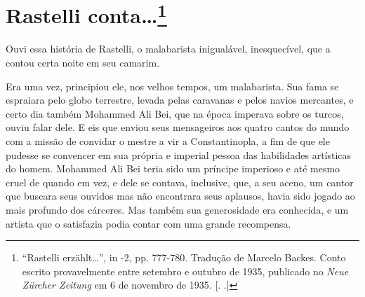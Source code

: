 \chapter{Rastelli conta\ldots{}\footnote[*]{``Rastelli erzählt\ldots{}'', in  -2, pp.
  777-780. Tradução de Marcelo Backes. Conto escrito provavelmente entre
  setembro e outubro de 1935, publicado no \emph{Neue Zürcher Zeitung}
  em 6 de novembro de 1935. [. .]} }
Ouvi essa história de Rastelli, o malabarista inigualável, inesquecível,
que a contou certa noite em seu camarim.

Era uma vez, principiou ele, nos velhos tempos, um malabarista. Sua fama
se espraiara pelo globo terrestre, levada pelas caravanas e pelos navios
mercantes, e certo dia também Mohammed Ali Bei, que na época imperava
sobre os turcos, ouviu falar dele. E eis que enviou seus mensageiros aos
quatro cantos do mundo com a missão de convidar o mestre a vir a
Constantinopla, a fim de que ele pudesse se convencer em sua própria e
imperial pessoa das habilidades artísticas do homem. Mohammed Ali Bei
teria sido um príncipe imperioso e até mesmo cruel de quando em vez, e
dele se contava, inclusive, que, a seu aceno, um cantor que buscara seus
ouvidos mas não encontrara seus aplausos, havia sido jogado ao mais
profundo dos cárceres. Mas também sua generosidade era conhecida, e um
artista que o satisfazia podia contar com uma grande recompensa.


